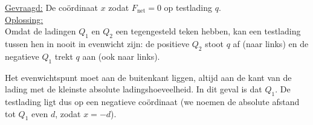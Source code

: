 \documentclass{ximera}
\begin{document}
\begin{exercise}
\begin{question}
\begin{solution}
            \underline{Gevraagd:} De coördinaat $x$ zodat \(F_{\text{net}}=0\) op testlading $q$. \\
    
            \underline{Oplossing:}\\
            Omdat de ladingen $Q_1$ en $Q_2$ een tegengesteld teken hebben, kan een testlading tussen hen in nooit in evenwicht zijn: de positieve $Q_2$ stoot $q$ af (naar links) en de negatieve $Q_1$ trekt $q$ aan (ook naar links). 
            
            Het evenwichtspunt moet aan de buitenkant liggen, altijd aan de kant van de lading met de kleinste absolute ladingshoeveelheid. In dit geval is dat $Q_1$. De testlading ligt dus op een negatieve coördinaat (we noemen de absolute afstand tot $Q_1$ even $d$, zodat $x = -d$).
            
            \begin{center}
            \end{center}
            

\end{solution}
\end{question}
\end{exercise}
\end{document}
